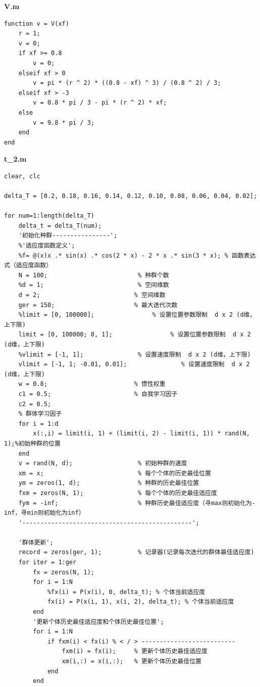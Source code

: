 \documentclass{my_paper}
\begin{document}
\noindent\textbf{V.m}
\begin{lstlisting}
function v = V(xf)
    r = 1;
    v = 0;
    if xf >= 0.8
        v = 0;
    elseif xf > 0
        v = pi * (r ^ 2) * ((0.8 - xf) ^ 3) / (0.8 ^ 2) / 3;
    elseif xf > -3
        v = 0.8 * pi / 3 - pi * (r ^ 2) * xf;
    else
        v = 9.8 * pi / 3;
    end
end
\end{lstlisting}

\noindent\textbf{t\_2.m}
\begin{lstlisting}
clear, clc

delta_T = [0.2, 0.18, 0.16, 0.14, 0.12, 0.10, 0.08, 0.06, 0.04, 0.02];

for num=1:length(delta_T)
    delta_t = delta_T(num);
    '初始化种群----------------';
    %'适应度函数定义';
    %f= @(x)x .* sin(x) .* cos(2 * x) - 2 * x .* sin(3 * x); % 函数表达式（适应度函数）
    N = 100;                         % 种群个数
    %d = 1;                          % 空间维数
    d = 2;                          % 空间维数
    ger = 150;                      % 最大迭代次数
    %limit = [0, 100000];                % 设置位置参数限制  d x 2 (d维，上下限)
    limit = [0, 100000; 0, 1];                % 设置位置参数限制  d x 2 (d维，上下限)
    %vlimit = [-1, 1];               % 设置速度限制  d x 2 (d维，上下限)
    vlimit = [-1, 1; -0.01, 0.01];               % 设置速度限制  d x 2 (d维，上下限)
    w = 0.8;                        % 惯性权重
    c1 = 0.5;                       % 自我学习因子
    c2 = 0.5;
    % 群体学习因子
    for i = 1:d
        x(:,i) = limit(i, 1) + (limit(i, 2) - limit(i, 1)) * rand(N, 1);%初始种群的位置
    end
    v = rand(N, d);                  % 初始种群的速度
    xm = x;                          % 每个个体的历史最佳位置
    ym = zeros(1, d);                % 种群的历史最佳位置
    fxm = zeros(N, 1);               % 每个个体的历史最佳适应度
    fym = -inf;                      % 种群历史最佳适应度（寻max则初始化为-inf，寻min则初始化为inf）
    '-----------------------------------------------';

    '群体更新';
    record = zeros(ger, 1);          % 记录器(记录每次迭代的群体最佳适应度)
    for iter = 1:ger
        fx = zeros(N, 1);
        for i = 1:N
            %fx(i) = P(x(i), 0, delta_t); % 个体当前适应度
            fx(i) = P(x(i, 1), x(i, 2), delta_t); % 个体当前适应度
        end
        '更新个体历史最佳适应度和个体历史最佳位置';
        for i = 1:N      
            if fxm(i) < fx(i) % < / > --------------------------
                fxm(i) = fx(i);     % 更新个体历史最佳适应度
                xm(i,:) = x(i,:);   % 更新个体历史最佳位置
            end 
        end


\end{lstlisting}
\end{document}

